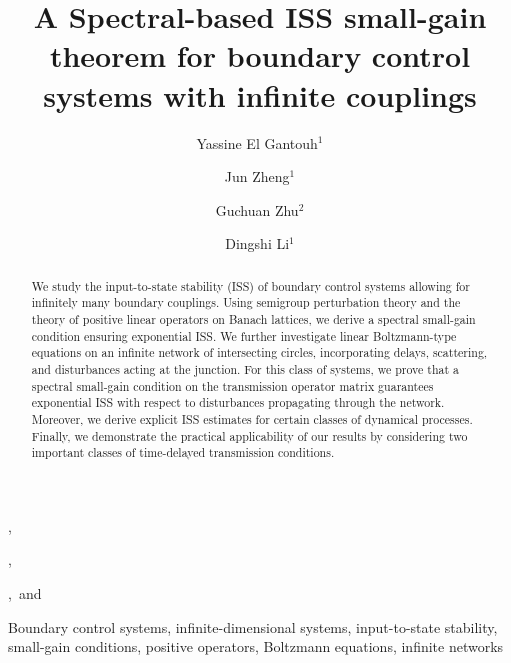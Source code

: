 \documentclass[onecolumn]{autart}
\numberwithin{equation}{section}
\begin{document}
%
\begin{frontmatter}

\title{A Spectral-based ISS small-gain theorem  for   boundary control systems with infinite couplings} %


\author{Yassine El Gantouh$^1$},
\author{Jun Zheng$^1$},
\author{Guchuan Zhu$^2$},\ and
\author{Dingshi Li$^1$}

\address{$^1${School of Mathematics}, Southwest Jiaotong University, Chengdu, 611756,  China}  %
\address{$^2$Department of Electrical Engineering, Polytechnique Montr\'{e}al, Montreal, H3T 1J4, Canada}

\begin{abstract}                           %
 We study the input-to-state stability (ISS) of boundary control systems allowing for infinitely many boundary couplings. Using semigroup perturbation theory and the theory of positive linear operators on Banach lattices, we derive a spectral small-gain condition ensuring exponential ISS. We further investigate linear Boltzmann-type equations on an infinite network of intersecting circles, incorporating delays, scattering, and disturbances acting at the junction. For this class of systems, we prove that a spectral small-gain condition on the transmission operator matrix guarantees exponential ISS with respect to disturbances propagating through the network. Moreover, we derive explicit ISS estimates for {certain} classes of dynamical processes. Finally, we demonstrate the practical applicability of our results by considering two important classes of time-delayed transmission conditions.
\end{abstract}

\vspace*{-12pt}
\begin{keyword}                            %
Boundary control systems, infinite-dimensional systems,  input-to-state stability,  small-gain conditions,  positive operators, Boltzmann equations, infinite networks
\end{keyword}
\end{frontmatter}
\endNoHyper
\end{document}
